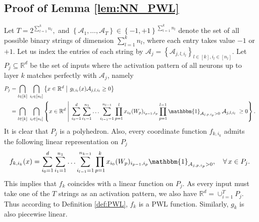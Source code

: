 \documentclass[11pt]{article}
\makeatletter
\def\RR{\mathbb{R}}
\def\Set#1{\left\{ #1 \right\}}
\def\Bigbar#1{\mathrel{\left|\vphantom{#1}\right.}}%
\def\Setbar#1#2{\Set{#1 \Bigbar{#1 #2} #2}}
\newenvironment{proof}{\par\noindent{\bf Proof:\ }}{\hfill$\Box$\\[2mm]}
\makeatother
\begin{document}
\subsection{Proof of Lemma \ref{lem:NN_PWL}}\label{app:lem:NN_PWL}
    Let $T=2^{\sum_{l=1}^{k} n_l},$
    and $\Set{\mathcal{A}_1,\ldots,\mathcal{A}_T}\in\Set{-1,+1}^{\sum_{l=1}^{k}n_l}$ 
    denote the set of all possible binary strings of dimension $\sum_{l=1}^{k}n_l$, where each entry takes value $-1$ or $+1.$ 
    Let us index the entries of each string by $\mathcal{A}_j=\Set{\mathcal{A}_{j,l,i_l}}_{l\in[k],i_l\in[n_l]}.$
    Let $P_j\subseteq\RR^d$ be the set of inputs 
    where the activation pattern of all neurons up to layer $k$
    matches perfectly with $\mathcal{A}_j$, namely
    \begin{align*}
	P_j
	&=\bigcap_{l\in[k]}\;\bigcap_{i_l\in[n_l]} \Setbar{x\in\RR^d}{g_{l,i_l}(x)\mathcal{A}_{j,l,i_l}\geq 0}\\
	&=\bigcap_{l\in[k]}\;\bigcap_{i_l\in[n_l]} \Setbar{x\in\RR^d}{ \sum_{i_0=1}^{d} \sum_{i_1=1}^{n_1}\ldots\sum_{i_{l-1}=1}^{n_{l-1}} \prod_{p=1}^{l} x_{i_0} (W_p)_{i_{p-1},i_p} \prod_{p=1}^{l-1} \mathbbm{1}_{\mathcal{A}_{j,p,i_p}> 0}\; \mathcal{A}_{j,l,i_l}\; \geq 0} .
    \end{align*}
    It is clear that $P_j$ is a polyhedron.
    Also, every coordinate function $f_{k,i_k}$ admits the following linear representation on $P_j$
    \begin{align*}
	f_{k,i_k}(x)=\sum_{i_0=1}^{d} \sum_{i_1=1}^{n_1}\ldots\sum_{i_{l-1}=1}^{n_{k-1}} \prod_{p=1}^{k} x_{i_0} (W_p)_{i_{p-1},i_p} \mathbbm{1}_{\mathcal{A}_{j,p,i_p}> 0},\quad\forall\,x\in P_j .
    \end{align*}
    This implies that $f_k$ coincides with a linear function on $P_j.$
    As every input must take one of the $T$ strings as an activation pattern, we also have $\RR^d=\cup_{i=1}^{T} P_j.$
    Thus according to Definition \ref{def:PWL}, $f_k$ is a PWL function.
    Similarly, $g_k$ is also piecewise linear.
\end{document}
